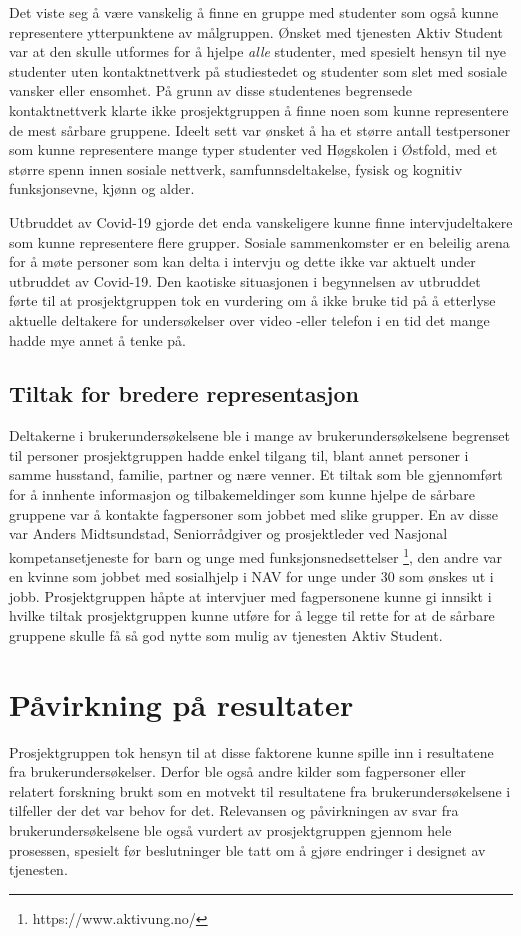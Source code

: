 Det viste seg å være vanskelig å finne en gruppe med studenter som også kunne representere ytterpunktene av målgruppen. Ønsket med tjenesten Aktiv Student var at den skulle utformes for å hjelpe {\em alle} studenter, med spesielt hensyn til nye studenter uten kontaktnettverk på studiestedet og studenter som slet med sosiale vansker eller ensomhet. På grunn av disse studentenes begrensede kontaktnettverk klarte ikke prosjektgruppen å finne noen som kunne representere de mest sårbare gruppene. Ideelt sett var ønsket å ha et større antall testpersoner som kunne representere mange typer studenter ved Høgskolen i Østfold, med et større spenn innen sosiale nettverk, samfunnsdeltakelse, fysisk og kognitiv funksjonsevne, kjønn og alder.

Utbruddet av Covid-19 gjorde det enda vanskeligere kunne finne intervjudeltakere som kunne representere flere grupper. Sosiale sammenkomster er en beleilig arena for å møte personer som kan delta i intervju og dette ikke var aktuelt under utbruddet av Covid-19. Den kaotiske situasjonen i begynnelsen av utbruddet førte til at prosjektgruppen tok en vurdering om å ikke bruke tid på å etterlyse aktuelle deltakere for undersøkelser over video -eller telefon i en tid det mange hadde mye annet å tenke på. 

\subsection{Tiltak for bredere representasjon}
Deltakerne i brukerundersøkelsene ble i mange av brukerundersøkelsene begrenset til personer prosjektgruppen hadde enkel tilgang til, blant annet personer i samme husstand, familie, partner og nære venner. Et tiltak som ble gjennomført for å innhente informasjon og tilbakemeldinger som kunne hjelpe de sårbare gruppene var å kontakte fagpersoner som jobbet med slike grupper. En av disse var Anders Midtsundstad, Seniorrådgiver og prosjektleder ved Nasjonal kompetansetjeneste for barn og unge med funksjonsnedsettelser \footnote{https://www.aktivung.no/}, den andre var en kvinne som jobbet med sosialhjelp i NAV for unge under 30 som ønskes ut i jobb. Prosjektgruppen håpte at intervjuer med fagpersonene kunne gi innsikt i hvilke tiltak prosjektgruppen kunne utføre for å legge til rette for at de sårbare gruppene skulle få så god nytte som mulig av tjenesten Aktiv Student.

\section{Påvirkning på resultater}
Prosjektgruppen tok hensyn til at disse faktorene kunne spille inn i resultatene fra brukerundersøkelser. Derfor ble også andre kilder som fagpersoner eller relatert forskning brukt som en motvekt til resultatene fra brukerundersøkelsene i tilfeller der det var behov for det. Relevansen og påvirkningen av svar fra brukerundersøkelsene ble også vurdert av prosjektgruppen gjennom hele prosessen, spesielt før beslutninger ble tatt om å gjøre endringer i designet av tjenesten. 

